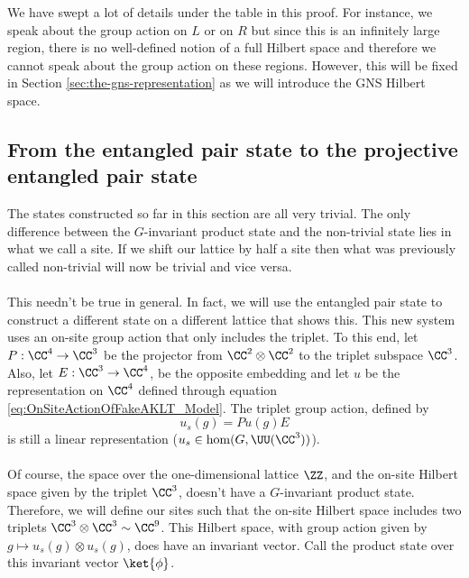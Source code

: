 \begin{remark}
	We have swept a lot of details under the table in this proof. For instance, we speak about the group action on $L$ or on $R$ but since this is an infinitely large region, there is no well-defined notion of a full Hilbert space and therefore we cannot speak about the group action on these regions. However, this will be fixed in Section \ref{sec:the-gns-representation} as we will introduce the GNS Hilbert space.
\end{remark}
\subsection{From the entangled pair state to the projective entangled pair state}\label{sec:from-the-entangled-pair-state-to-the-projective-entangled-pair-state}
The states constructed so far in this section are all very trivial. The only difference between the $G$-invariant product state and the non-trivial state lies in what we call a site. If we shift our lattice by half a site then what was previously called non-trivial will now be trivial and vice versa.
\\\\
This needn't be true in general. In fact, we will use the entangled pair state to construct a different state on a different lattice that shows this. This new system uses an on-site group action that only includes the triplet. To this end, let $P:\CC^4\rightarrow \CC^3$ be the projector from $\CC^2\otimes\CC^2$ to the triplet subspace $\CC^3$. Also, let $E:\CC^3\rightarrow \CC^4$, be the opposite embedding and let $u$ be the representation on $\CC^4$ defined through equation \ref{eq:OnSiteActionOfFakeAKLT_Model}. The triplet group action, defined by
\begin{equation}
	u_s(g)=P u(g) E
\end{equation}
is still a linear representation ($u_s\in\hom(G,\UU(\CC^3))$).
\\\\
Of course, the space over the one-dimensional lattice $\ZZ$, and the on-site Hilbert space given by the triplet $\CC^3$, doesn't have a $G$-invariant product state. Therefore, we will define our sites such that the on-site Hilbert space includes two triplets $\CC^3\otimes\CC^3\sim \CC^9$. This Hilbert space, with group action given by $g\mapsto u_s(g)\otimes u_s(g)$, does have an invariant vector. Call the product state over this invariant vector $\ket{\phi}$.
\\\\
